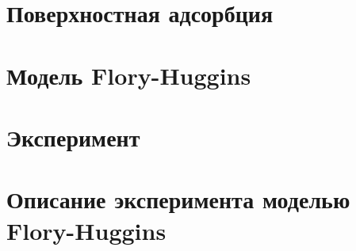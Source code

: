 \section{Поверхностная адсорбция}
\label{Subsec:AdsorbSurf}



\cite{Gambosh:1951} 

\section{Модель Flory-Huggins}
\label{Subsec:AdsorbVol}


\section{Эксперимент}
\label{Subsec:AdsorbExp}


\section{Описание эксперимента моделью Flory-Huggins}
\label{Subsec:K}

